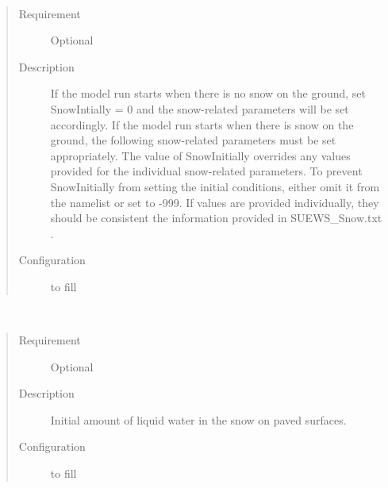 \documentclass[letterpaper,10pt,english]{sphinxmanual}
\begin{document}
\begin{fulllineitems}
\label{\detokenize{input_files/Initial_Conditions/Snow_related_parameters:cmdoption-arg-snowintially}}~\begin{quote}\begin{description}
\item[{Requirement}] \leavevmode
Optional

\item[{Description}] \leavevmode
If the model run starts when there is no snow on the ground, set SnowIntially = 0 and the snow-related parameters will be set accordingly. If the model run starts when there is snow on the ground, the following snow-related parameters must be set appropriately. The value of SnowInitially overrides any values provided for the individual snow-related parameters. To prevent SnowInitially from setting the initial conditions, either omit it from the namelist or set to -999. If values are provided individually, they should be consistent the information provided in SUEWS\_Snow.txt .

\item[{Configuration}] \leavevmode
to fill

\end{description}\end{quote}

\end{fulllineitems}


\begin{fulllineitems}
\label{\detokenize{input_files/Initial_Conditions/Snow_related_parameters:cmdoption-arg-snowwaterpavedstate}}~\begin{quote}\begin{description}
\item[{Requirement}] \leavevmode
Optional

\item[{Description}] \leavevmode
Initial amount of liquid water in the snow on paved surfaces.

\item[{Configuration}] \leavevmode
to fill

\end{description}\end{quote}

\end{fulllineitems}
\end{document}
